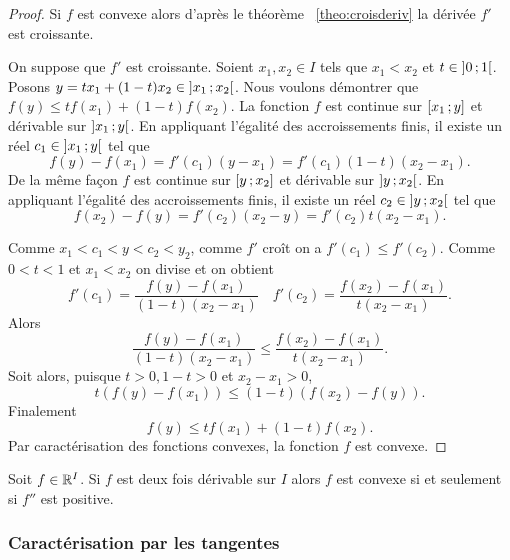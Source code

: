 \begin{proof}
  Si \(f\) est convexe alors d'après le théorème~
\ref{theo:croisderiv} la dérivée \(f'\) est croissante.

  On suppose que \(f'\) est croissante. Soient \(x_1,x_2 \in I\) tels que \(x_1<x_2\) et \(t \in \left] 0 \, ;  1 \right[\). Posons \(y=tx_1+(1-t)x_2 \in \left] x_1 \, ;  x_2 \right[\). Nous voulons démontrer que \(f(y) \leqslant tf(x_1)+(1-t)f(x_2)\). La fonction \(f\) est continue sur \(\left[ x_1 \, ;  y \right]\) et dérivable sur \(\left] x_1 \, ;  y \right[\). En appliquant l'égalité des accroissements finis, il existe un réel \(c_1 \in \left] x_1 \, ;  y \right[\) tel que
  \begin{equation}
    f(y)-f(x_1)=f'(c_1)(y-x_1)=f'(c_1)(1-t)(x_2-x_1).
  \end{equation}
  De la même façon \(f\) est continue sur \(\left[ y \, ;  x_2 \right]\) et dérivable sur \(\left] y \, ;  x_2 \right[\). En appliquant l'égalité des accroissements finis, il existe un réel \(c_2 \in \left] y \, ;  x_2 \right[\) tel que
  \begin{equation}
    f(x_2)-f(y)=f'(c_2)(x_2-y)=f'(c_2)t(x_2-x_1).
  \end{equation}

Comme \(x_1<c_1<y<c_2<y_2\), comme \(f'\) croît on a \(f'(c_1) \leqslant f'(c_2)\). Comme \(0<t<1\) et \(x_1<x_2\) on divise et on obtient
\begin{equation}
  f'(c_1) = \frac{f(y)-f(x_1)}{(1-t)(x_2-x_1)} \quad f'(c_2) = \frac{f(x_2)-f(x_1)}{t(x_2-x_1)}.
\end{equation}
Alors
\begin{equation}
  \frac{f(y)-f(x_1)}{(1-t)(x_2-x_1)} \leqslant \frac{f(x_2)-f(x_1)}{t(x_2-x_1)}.
\end{equation}
Soit alors, puisque \(t>0, 1-t>0\) et \(x_2-x_1>0\),
\begin{equation}
  t(f(y)-f(x_1)) \leqslant (1-t)(f(x_2)-f(y)).
\end{equation}
Finalement
\begin{equation}
  f(y) \leqslant tf(x_1)+(1-t)f(x_2).
\end{equation}
Par caractérisation des fonctions convexes, la fonction \(f\) est convexe.
\end{proof}
\begin{corth}
  Soit \(f \in \mathbb{R}^I\). Si \(f\) est deux fois dérivable sur \(I\) alors \(f\) est convexe si et seulement si \(f''\) est positive.
\end{corth}

\subsubsection{Caractérisation par les tangentes}

